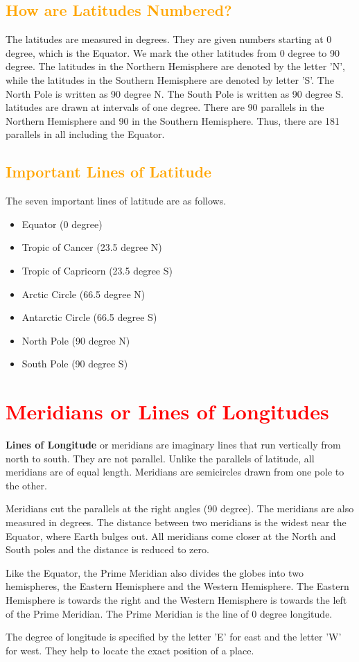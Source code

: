 \subsection{\textcolor{orange}{How are Latitudes Numbered?}}
The latitudes are measured in degrees. They are given numbers starting at 0 degree, which is the Equator. We mark the other latitudes from 0 degree to 90 degree. The latitudes in the Northern Hemisphere are denoted by the letter 'N', while the latitudes in the Southern Hemisphere are denoted by letter 'S'. The North Pole is written as 90 degree N. The South Pole is written as 90 degree S. latitudes are drawn at intervals of one degree. There are 90 parallels in the Northern Hemisphere and 90 in the Southern Hemisphere. Thus, there are 181 parallels in all including the Equator.
\subsection{\textcolor{Orange}{Important Lines of Latitude}}
The seven important lines of latitude are as follows.
\vspace{0.1in}
\begin{itemize}
    \item Equator (0 degree)
    \item Tropic of Cancer (23.5 degree N)
    \item Tropic of Capricorn (23.5 degree S)
    \item Arctic Circle (66.5 degree N)
    \item Antarctic Circle (66.5 degree S)
    \item North Pole (90 degree N)
    \item South Pole (90 degree S)
\end{itemize}
\section{\textcolor{red}{Meridians or Lines of Longitudes}}
\textbf{Lines of Longitude} or meridians are imaginary lines that run vertically from north to south. They are not parallel. Unlike the parallels of latitude, all meridians are of equal length. Meridians are semicircles drawn from one pole to the other.
\vspace{0.1in}
\par
Meridians cut the parallels at the right angles (90 degree). The meridians are also measured in degrees. The distance between two meridians is the widest near the Equator, where Earth bulges out. All meridians come closer at the North and South poles and the distance is reduced to zero.
\vspace{0.5in}
\par
Like the Equator, the Prime Meridian also divides the globes into two hemispheres, the Eastern Hemisphere and the Western Hemisphere. The Eastern Hemisphere is towards the right and the Western Hemisphere is towards the left of the Prime Meridian. The Prime Meridian is the line of 0 degree longitude.
\vspace{0.1in}
\par
The degree of longitude is specified by the letter 'E' for east and the letter 'W' for west. They help to locate the exact position of a place.

